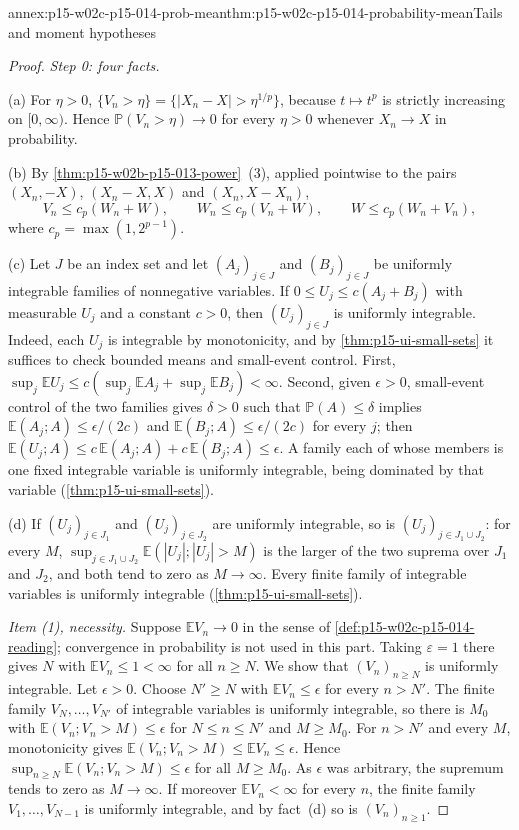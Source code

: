 \begin{annexitem}{annex:p15-w02c-p15-014-prob-mean}{thm:p15-w02c-p15-014-probability-mean}{Tails and moment hypotheses}
\begin{proof}
\emph{Step 0: four facts.}

(a) For \(\eta>0\), \(\{V_n>\eta\}=\{|X_n-X|>\eta^{1/p}\}\), because
\(t\mapsto t^p\) is strictly increasing on \([0,\infty)\). Hence
\(\mathbb P(V_n>\eta)\to0\) for every \(\eta>0\) whenever
\(X_n\to X\) in probability.

(b) By \cref{thm:p15-w02b-p15-013-power}~(3), applied pointwise to the
pairs \((X_n,-X)\), \((X_n-X,X)\) and \((X_n,X-X_n)\),
\[
 V_n\leq c_p(W_n+W),\qquad W_n\leq c_p(V_n+W),\qquad
 W\leq c_p(W_n+V_n),
\]
where \(c_p=\max(1,2^{p-1})\).

(c) Let \(J\) be an index set and let \((A_j)_{j\in J}\) and
\((B_j)_{j\in J}\) be uniformly integrable families of nonnegative
variables. If
\(0\leq U_j\leq c(A_j+B_j)\) with measurable \(U_j\) and a constant
\(c>0\), then \((U_j)_{j\in J}\) is uniformly integrable. Indeed, each
\(U_j\) is integrable by monotonicity, and by
\cref{thm:p15-ui-small-sets} it suffices to check bounded means and
small-event control. First,
\(\sup_j\mathbb EU_j\leq c(\sup_j\mathbb EA_j+\sup_j\mathbb EB_j)<\infty\).
Second, given \(\epsilon>0\), small-event control of the two families
gives \(\delta>0\) such that \(\mathbb P(A)\leq\delta\) implies
\(\mathbb E(A_j;A)\leq\epsilon/(2c)\) and
\(\mathbb E(B_j;A)\leq\epsilon/(2c)\) for every \(j\); then
\(\mathbb E(U_j;A)\leq c\,\mathbb E(A_j;A)+c\,\mathbb E(B_j;A)\leq\epsilon\).
A family each of whose members is one fixed integrable variable is
uniformly integrable, being dominated by that variable
(\cref{thm:p15-ui-small-sets}).

(d) If \((U_j)_{j\in J_1}\) and \((U_j)_{j\in J_2}\) are uniformly
integrable, so is \((U_j)_{j\in J_1\cup J_2}\): for every \(M\),
\(\sup_{j\in J_1\cup J_2}\mathbb E(|U_j|;|U_j|>M)\) is the larger of
the two suprema over \(J_1\) and \(J_2\), and both tend to zero as
\(M\to\infty\). Every finite family of integrable variables is
uniformly integrable (\cref{thm:p15-ui-small-sets}).

\emph{Item (1), necessity.} Suppose \(\mathbb EV_n\to0\) in the sense
of \cref{def:p15-w02c-p15-014-reading}; convergence in probability is
not used in this part. Taking \(\varepsilon=1\) there gives \(N\) with
\(\mathbb EV_n\leq1<\infty\) for all \(n\geq N\). We show that
\((V_n)_{n\geq N}\) is uniformly integrable. Let \(\epsilon>0\). Choose
\(N'\geq N\) with \(\mathbb EV_n\leq\epsilon\) for every \(n>N'\). The
finite family \(V_N,\ldots,V_{N'}\) of integrable variables is uniformly
integrable, so there is \(M_0\) with
\(\mathbb E(V_n;V_n>M)\leq\epsilon\) for \(N\leq n\leq N'\) and
\(M\geq M_0\). For \(n>N'\) and every \(M\), monotonicity gives
\(\mathbb E(V_n;V_n>M)\leq\mathbb EV_n\leq\epsilon\). Hence
\(\sup_{n\geq N}\mathbb E(V_n;V_n>M)\leq\epsilon\) for all \(M\geq M_0\).
As \(\epsilon\) was arbitrary, the supremum tends to zero as
\(M\to\infty\). If moreover \(\mathbb EV_n<\infty\) for every \(n\),
the finite family \(V_1,\ldots,V_{N-1}\) is uniformly integrable, and
by fact~(d) so is \((V_n)_{n\geq1}\).


\end{proof}
\end{annexitem}
